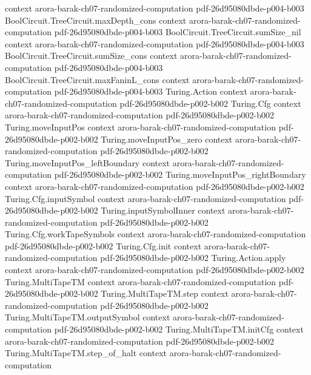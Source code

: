 \begin{theorem}
  {context}
  {arora-barak-ch07-randomized-computation}
  {pdf-26d95080dbde-p004-b003}
\proofstep
  {BoolCircuit.TreeCircuit.maxDepth_cons}
  {context}
  {arora-barak-ch07-randomized-computation}
  {pdf-26d95080dbde-p004-b003}
\proofstep
  {BoolCircuit.TreeCircuit.sumSize_nil}
  {context}
  {arora-barak-ch07-randomized-computation}
  {pdf-26d95080dbde-p004-b003}
\proofstep
  {BoolCircuit.TreeCircuit.sumSize_cons}
  {context}
  {arora-barak-ch07-randomized-computation}
  {pdf-26d95080dbde-p004-b003}
\proofstep
  {BoolCircuit.TreeCircuit.maxFaninL_cons}
  {context}
  {arora-barak-ch07-randomized-computation}
  {pdf-26d95080dbde-p004-b003}
\proofstep
  {Turing.Action}
  {context}
  {arora-barak-ch07-randomized-computation}
  {pdf-26d95080dbde-p002-b002}
\proofstep
  {Turing.Cfg}
  {context}
  {arora-barak-ch07-randomized-computation}
  {pdf-26d95080dbde-p002-b002}
\proofstep
  {Turing.moveInputPos}
  {context}
  {arora-barak-ch07-randomized-computation}
  {pdf-26d95080dbde-p002-b002}
\proofstep
  {Turing.moveInputPos_zero}
  {context}
  {arora-barak-ch07-randomized-computation}
  {pdf-26d95080dbde-p002-b002}
\proofstep
  {Turing.moveInputPos_leftBoundary}
  {context}
  {arora-barak-ch07-randomized-computation}
  {pdf-26d95080dbde-p002-b002}
\proofstep
  {Turing.moveInputPos_rightBoundary}
  {context}
  {arora-barak-ch07-randomized-computation}
  {pdf-26d95080dbde-p002-b002}
\proofstep
  {Turing.Cfg.inputSymbol}
  {context}
  {arora-barak-ch07-randomized-computation}
  {pdf-26d95080dbde-p002-b002}
\proofstep
  {Turing.inputSymbolInner}
  {context}
  {arora-barak-ch07-randomized-computation}
  {pdf-26d95080dbde-p002-b002}
\proofstep
  {Turing.Cfg.workTapeSymbols}
  {context}
  {arora-barak-ch07-randomized-computation}
  {pdf-26d95080dbde-p002-b002}
\proofstep
  {Turing.Cfg.init}
  {context}
  {arora-barak-ch07-randomized-computation}
  {pdf-26d95080dbde-p002-b002}
\proofstep
  {Turing.Action.apply}
  {context}
  {arora-barak-ch07-randomized-computation}
  {pdf-26d95080dbde-p002-b002}
\proofstep
  {Turing.MultiTapeTM}
  {context}
  {arora-barak-ch07-randomized-computation}
  {pdf-26d95080dbde-p002-b002}
\proofstep
  {Turing.MultiTapeTM.step}
  {context}
  {arora-barak-ch07-randomized-computation}
  {pdf-26d95080dbde-p002-b002}
\proofstep
  {Turing.MultiTapeTM.outputSymbol}
  {context}
  {arora-barak-ch07-randomized-computation}
  {pdf-26d95080dbde-p002-b002}
\proofstep
  {Turing.MultiTapeTM.initCfg}
  {context}
  {arora-barak-ch07-randomized-computation}
  {pdf-26d95080dbde-p002-b002}
\proofstep
  {Turing.MultiTapeTM.step_of_halt}
  {context}
  {arora-barak-ch07-randomized-computation}

\end{theorem}
